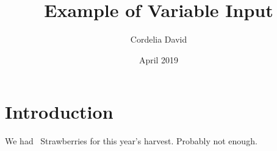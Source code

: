 \documentclass{article} \usepackage[utf8]{inputenc}
\title{Example of Variable Input}
\author{Cordelia David} \date{April 2019}
\begin{document}
\maketitle

\section{Introduction}

We had \Strawberries\ Strawberries for this year's harvest. Probably not enough.
\end{document}
